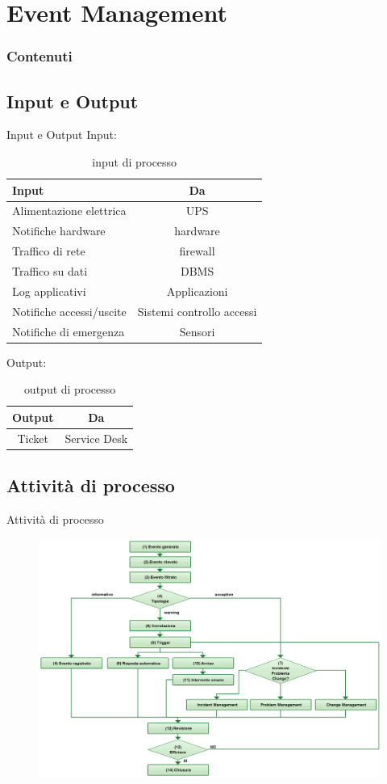 %
\section{Event Management}
\frame
{
\frametitle{Contenuti}
\tableofcontents[currentsection]
}

\subsection*{Input e Output}
\begin{frame}{Input e Output}
Input:
\begin{table}
\begin{tabular}{ l | c }
\textbf{Input} & \textbf{Da}\\
\hline
Alimentazione elettrica & UPS\\
Notifiche hardware & hardware\\
Traffico di rete & firewall\\
Traffico su dati & DBMS\\
Log applicativi & Applicazioni\\
Notifiche accessi/uscite & Sistemi controllo accessi\\
Notifiche di emergenza & Sensori\\
\end{tabular}
\caption{input di processo}
\end{table}
Output:
\begin{table}
\begin{tabular}{ c | c }
\textbf{Output} & \textbf{Da}\\
\hline
Ticket & Service Desk\\
\end{tabular}
\caption{output di processo}
\end{table}
\end{frame}

\subsection*{Attività di processo}
\begin{frame}{Attività di processo}
\begin{figure}
\includegraphics[scale=0.22]{Images/Event_management.png}
\end{figure}
\end{frame}